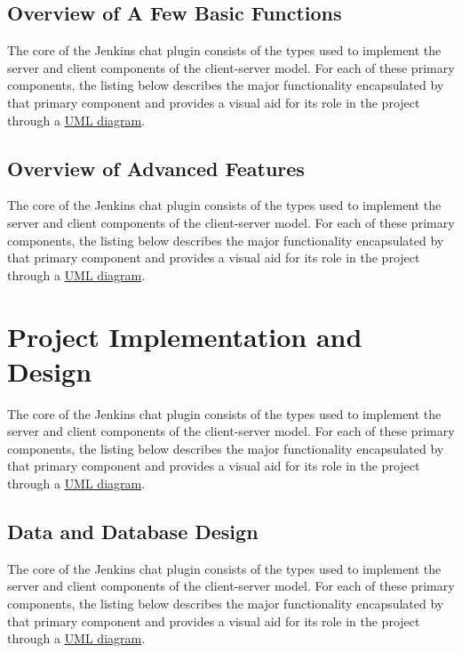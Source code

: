 \documentclass{article}
\begin{document}
		\subsection[Basic Functions]{Overview of A Few Basic Functions}
		The core of the Jenkins chat plugin consists of the types used to
		implement the server and client components of the client-server model.
		For each of these primary components, the listing below describes the
		major functionality encapsulated by that primary component and provides
		a visual aid for its role in the project through a 
		\href{http://www.csci.csusb.edu/dick/samples/uml0.html}{UML diagram}.

		\subsection[Advanced Functions]{Overview of Advanced Features}
		The core of the Jenkins chat plugin consists of the types used to
		implement the server and client components of the client-server model.
		For each of these primary components, the listing below describes the
		major functionality encapsulated by that primary component and provides
		a visual aid for its role in the project through a 
		\href{http://www.csci.csusb.edu/dick/samples/uml0.html}{UML diagram}.

	\section[Project Implementation]{Project Implementation and Design}
	The core of the Jenkins chat plugin consists of the types used to
	implement the server and client components of the client-server model.
	For each of these primary components, the listing below describes the
	major functionality encapsulated by that primary component and provides
	a visual aid for its role in the project through a 
	\href{http://www.csci.csusb.edu/dick/samples/uml0.html}{UML diagram}.

		\subsection[Database Design]{Data and Database Design}
		The core of the Jenkins chat plugin consists of the types used to
		implement the server and client components of the client-server model.
		For each of these primary components, the listing below describes the
		major functionality encapsulated by that primary component and provides
		a visual aid for its role in the project through a 
		\href{http://www.csci.csusb.edu/dick/samples/uml0.html}{UML diagram}.
\end{document}
